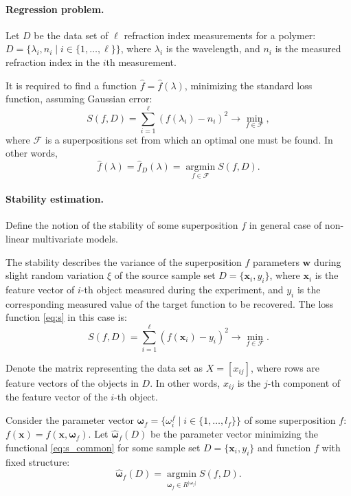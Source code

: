\documentclass[11pt,a4paper]{article}
\theoremstyle{definition}
\begin{document}
\paragraph{Regression problem.}
Let $D$ be the data set of $\ell$ refraction index measurements for a polymer:
$D = \{ \lambda_i, n_i \mid i \in \{ 1, \dots, \ell \} \}$, where $\lambda_i$ is the wavelength,
and $n_i$ is the measured refraction index in the $i$th measurement.

It is required to find a function $\hat{f} = \hat{f}(\lambda)$, minimizing the standard
loss function, assuming Gaussian error:
\begin{equation}
  S(f, D) = \sum_{i = 1}^\ell (f(\lambda_i) - n_i)^2 \rightarrow \min_{f \in \mathcal{F}},
  \label{eq:s}
\end{equation}
where $\mathcal{F}$ is a superpositions set from which an optimal one must be found. In other words,
\begin{equation}
  \hat{f}(\lambda) = \hat{f}_D(\lambda) = \mathop{\arg \min}\limits_{f \in \mathcal{F}} S(f, D).
  \label{eq:fhat}
\end{equation}

\paragraph{Stability estimation.}
Define the notion of the stability of some superposition $f$ in general case of non-linear
multivariate models.

The stability describes the variance of the superposition $f$ parameters $\boldsymbol{w}$
during slight random variation $\xi$ of the source sample set
$D = \{ \mathbf{x}_i, y_i \}$,
where $\mathbf{x}_i$ is the feature vector of $i$-th object measured during
the experiment, and $y_i$ is the corresponding measured value of the target function
to be recovered. The loss function \eqref{eq:s} in this case is:
\begin{equation}
  S(f, D) = \sum_{i = 1}^\ell (f(\mathbf{x}_i) - y_i)^2 \rightarrow \min_{f \in \mathcal{F}}.
  \label{eq:s_common}
\end{equation}

Denote the matrix representing the data set as $X = [ x_{ij} ]$, where
rows are feature vectors of the objects in $D$. In other words, $x_{ij}$
is the $j$-th component of the feature vector of the $i$-th object.

Consider the parameter vector
$\boldsymbol{\omega}_f = \{ \omega_i^f \mid i \in \{ 1, \dots, l_f \} \}$
of some superposition $f$: $f(\mathbf{x}) = f(\mathbf{x}, \boldsymbol{\omega}_f)$.
Let $\hat{\boldsymbol{\omega}}_f(D)$ be the parameter vector minimizing the
functional \eqref{eq:s_common} for some sample set $D = \{ \mathbf{x}_i, y_i \}$ and
function $f$ with fixed structure:
\[
  \hat{\boldsymbol{\omega}}_f(D) = \mathop{\arg \min}\limits_{\boldsymbol{\omega}_f \in R^{| \boldsymbol{\omega}_f |}} S(f, D).
\]
\end{document}
